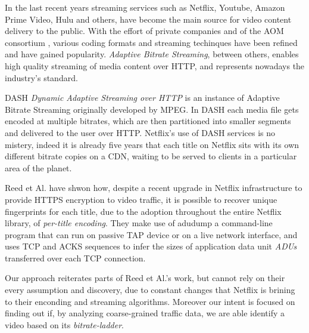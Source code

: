 
In the last recent years streaming services such as Netflix, Youtube, Amazon
Prime Video, Hulu and others, have become the main source for video content
delivery to the public. With the effort of private companies and of the AOM
consortium \cite{aom}, various coding formats and streaming techinques have
been refined and have gained popularity. \textit{Adaptive Bitrate Streaming},
between others, enables high quality streaming of media content over HTTP, and
represents nowadays the industry's standard. 

DASH \textit{Dynamic Adaptive Streaming over HTTP} is an instance of Adaptive
Bitrate Streaming originally developed by MPEG. In DASH each media file gets
encoded at multiple bitrates, which are then partitioned into smaller segments
and delivered to the user over HTTP.  Netflix's use of DASH services is no
mistery, indeed it is already five years that each title on Netflix sits with
its own different bitrate copies on a CDN, waiting to be served to clients in a
particular area of the planet. \cite{per-title-encoding}

Reed et Al. \cite{netflix-real-time} have shwon how, despite a recent upgrade
in Netflix infrastructure to provide HTTPS encryption to video traffic, it is
possible to recover unique fingerprints for each title, due to the adoption
throughout the entire Netflix library, of \emph{per-title encoding}. They make
use of adudump \cite{adudump} a command-line program that can run on passive
TAP device \cite{tap} or on a live network interface, and uses TCP and ACKS
sequences to infer the sizes of application data unit \emph{ADUs} transferred
over each TCP connection. 

Our approach reiterates parts of Reed et Al.'s work, but cannot rely on their
every assumption and discovery, due to constant changes that Netflix is brining
to their enconding and streaming algorithms. Moreover our intent is focused on
finding out if, by analyzing coarse-grained traffic data, we are able identify
a video based on its \emph{bitrate-ladder}.

